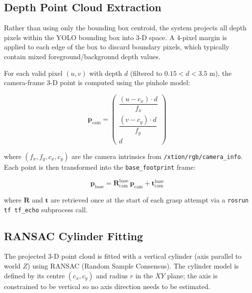 \subsection{Depth Point Cloud Extraction}

Rather than using only the bounding box centroid, the system projects all depth pixels
within the YOLO bounding box into 3-D space.
A 4-pixel margin is applied to each edge of the box to discard boundary pixels, which
typically contain mixed foreground/background depth values.

For each valid pixel $(u, v)$ with depth $d$ (filtered to $0.15 < d < 3.5$ m), the
camera-frame 3-D point is computed using the pinhole model:

\begin{equation}
  \mathbf{p}_{\text{cam}} =
  \begin{pmatrix}
    \dfrac{(u - c_x) \cdot d}{f_x} \\[8pt]
    \dfrac{(v - c_y) \cdot d}{f_y} \\[8pt]
    d
  \end{pmatrix}
\end{equation}

where $(f_x, f_y, c_x, c_y)$ are the camera intrinsics from \texttt{/xtion/rgb/camera\_info}.
Each point is then transformed into the \texttt{base\_footprint} frame:

\begin{equation}
  \mathbf{p}_{\text{base}} = \mathbf{R}_{\text{cam}}^{\text{base}} \, \mathbf{p}_{\text{cam}}
                            + \mathbf{t}_{\text{cam}}^{\text{base}}
\end{equation}

where $\mathbf{R}$ and $\mathbf{t}$ are retrieved once at the start of each grasp
attempt via a \texttt{rosrun tf tf\_echo} subprocess call.

\subsection{RANSAC Cylinder Fitting}
\label{sec:ransac}

The projected 3-D point cloud is fitted with a vertical cylinder (axis parallel to
world $Z$) using RANSAC (Random Sample Consensus).
The cylinder model is defined by its centre $(c_x, c_y)$ and radius $r$ in the $XY$
plane; the axis is constrained to be vertical so no axis direction needs to be estimated.

